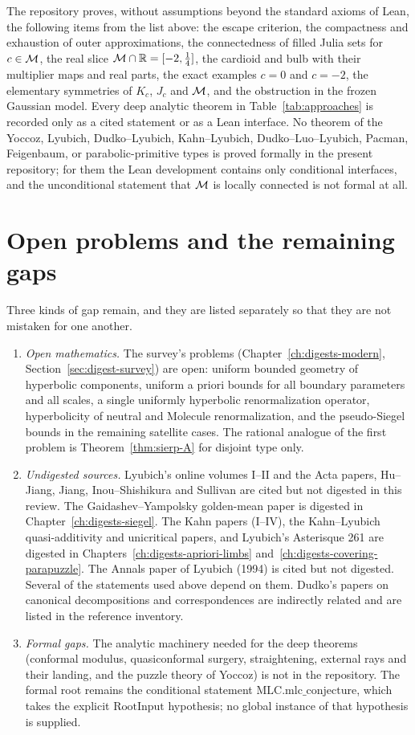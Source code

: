 The repository proves, without assumptions beyond the standard axioms of Lean, the following items from the list above:
the escape criterion, the compactness and exhaustion of outer approximations, the connectedness of filled Julia sets for
$c\in\mathcal M$, the real slice $\mathcal M\cap\mathbb R=[-2,\tfrac14]$, the cardioid and bulb with their multiplier maps and real parts, the
exact examples $c=0$ and $c=-2$, the elementary symmetries of $K_c$, $J_c$ and $\mathcal M$, and the obstruction in the frozen Gaussian model.  Every deep analytic theorem in
Table~\ref{tab:approaches} is recorded only as a cited statement or as a Lean interface.  No theorem of the
Yoccoz, Lyubich, Dudko--Lyubich, Kahn--Lyubich, Dudko--Luo--Lyubich, Pacman, Feigenbaum, or parabolic-primitive types is
proved formally in the present repository; for them the Lean development contains only conditional interfaces, and the unconditional statement that $\mathcal M$ is locally connected is not formal at all.

\section{Open problems and the remaining gaps}
\label{sec:approaches-open}

Three kinds of gap remain, and they are listed separately so that they are not mistaken for one another.

\begin{enumerate}
\item \emph{Open mathematics.}  The survey's problems (Chapter~\ref{ch:digests-modern}, Section~\ref{sec:digest-survey}) are
  open: uniform bounded geometry of hyperbolic components, uniform a priori bounds for all boundary parameters and all scales,
  a single uniformly hyperbolic renormalization operator, hyperbolicity of neutral and Molecule renormalization, and the
  pseudo-Siegel bounds in the remaining satellite cases.  The rational analogue of the first problem is Theorem~\ref{thm:sierp-A}
  for disjoint type only.
\item \emph{Undigested sources.}  Lyubich's online volumes I--II and the Acta papers, Hu--Jiang, Jiang,
  Inou--Shishikura and Sullivan are cited but not digested in this review.  The Gaidashev--Yampolsky golden-mean paper is digested in Chapter~\ref{ch:digests-siegel}.  The Kahn papers (I--IV), the Kahn--Lyubich quasi-additivity and unicritical papers, and Lyubich's Asterisque 261 are digested in Chapters~\ref{ch:digests-apriori-limbs} and~\ref{ch:digests-covering-parapuzzle}.  The Annals paper of Lyubich (1994) is cited but not digested.  Several of the statements
  used above depend on them.  Dudko's papers on canonical decompositions and correspondences are indirectly related and are
  listed in the reference inventory.
\item \emph{Formal gaps.}  The analytic machinery needed for the deep theorems (conformal modulus, quasiconformal surgery,
  straightening, external rays and their landing, and the puzzle theory of Yoccoz) is not in the repository.  The formal
  root remains the conditional statement $\mathrm{MLC.mlc\_conjecture}$, which takes the explicit $\mathrm{RootInput}$
  hypothesis; no global instance of that hypothesis is supplied.
\end{enumerate}

